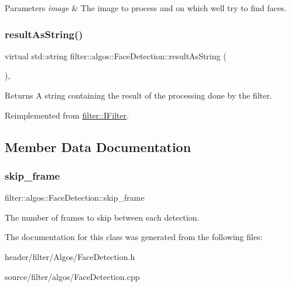 \begin{DoxyParams}{Parameters}
{\em image} & The image to process and on which we\textquotesingle{}ll try to find faces. \\
\hline
\end{DoxyParams}
\mbox{\label{classfilter_1_1algos_1_1_face_detection_a11c5004107d5048de93ae81ced065a26}} 
\subsubsection{\texorpdfstring{result\+As\+String()}{resultAsString()}}
{\footnotesize\ttfamily virtual std\+::string filter\+::algos\+::\+Face\+Detection\+::result\+As\+String (\begin{DoxyParamCaption}{ }\end{DoxyParamCaption})\hspace{0.3cm}{\ttfamily [inline]}, {\ttfamily [virtual]}}

\begin{DoxyReturn}{Returns}
A string containing the result of the processing done by the filter. 
\end{DoxyReturn}


Reimplemented from \hyperlink{classfilter_1_1_i_filter_ab99902b060a6d9edc3452a8c9f85e37e}{filter\+::\+I\+Filter}.



\subsection{Member Data Documentation}
\mbox{\label{classfilter_1_1algos_1_1_face_detection_a2dcb3e622ff24852e0c81beea2dc7681}} 
\subsubsection{\texorpdfstring{skip\+\_\+frame}{skip\_frame}}
{\footnotesize\ttfamily filter\+::algos\+::\+Face\+Detection\+::skip\+\_\+frame}

The number of frames to skip between each detection. 

The documentation for this class was generated from the following files\+:\begin{DoxyCompactItemize}
\item 
header/filter/\+Algos/Face\+Detection.\+h\item 
source/filter/algos/Face\+Detection.\+cpp\end{DoxyCompactItemize}
